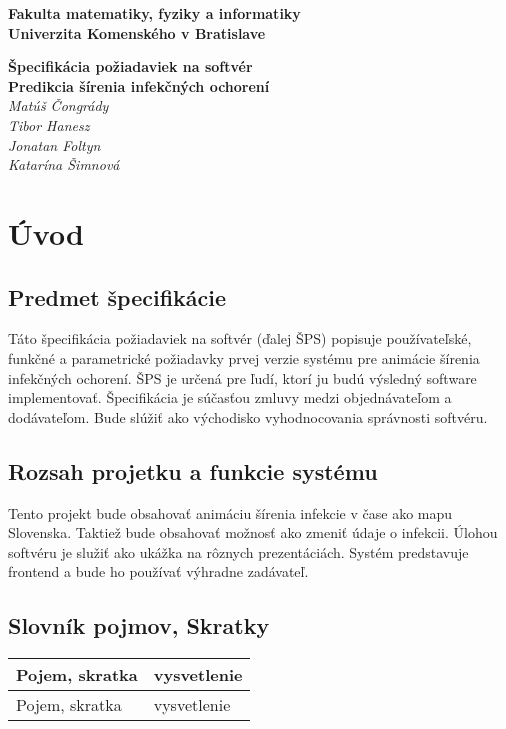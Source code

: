 \documentclass[12pt,a4paper]{report}
\begin{document}
\begin{titlepage}
\centering\bfseries
		Fakulta matematiky, fyziky a informatiky\\Univerzita Komenského v Bratislave	

	\fontsize{23}{28}\textbf{Špecifikácia požiadaviek na softvér}\\
	\fontsize{16}{22}\textbf{Predikcia šírenia infekčných ochorení}\\
	\large\textit{Matúš Čongrády\\Tibor Hanesz\\Jonatan Foltyn\\Katarína Šimnová}

\end{titlepage}\bigskip
	\setcounter{tocdepth}{9}
	\tableofcontents
	
\renewcommand{\chaptername}{}	
	\chapter[Úvod]{\rmfamily\bfseries
Úvod}


\section[Predmet špecifikácie]{\rmfamily\bfseries
	Predmet špecifikácie}
Táto špecifikácia požiadaviek na softvér (ďalej ŠPS) popisuje používateľské, funkčné a parametrické požiadavky prvej verzie systému pre animácie šírenia infekčných ochorení. ŠPS je určená pre ľudí, ktorí ju budú výsledný software implementovať. Špecifikácia je súčasťou zmluvy medzi objednávateľom a dodávateľom. Bude slúžiť ako východisko vyhodnocovania správnosti softvéru.

\section[Rozsah projetku a funkcie systému]{\rmfamily\bfseries
Rozsah projetku a funkcie systému}	
Tento projekt bude obsahovať animáciu šírenia infekcie v čase ako mapu Slovenska. Taktiež bude obsahovať možnosť ako zmeniť údaje o infekcii. Úlohou softvéru je služiť ako ukážka na rôznych prezentáciách. Systém predstavuje frontend a bude ho používať výhradne zadávateľ. 

\section[Slovník pojmov, Skratky]{\rmfamily\bfseries
	Slovník pojmov, Skratky}	
\begin{table}[h!]
	\centering
	\begin{tabular}{|>{\centering\arraybackslash}m{1in}|>{\centering\arraybackslash}m{1in}|}
		\hline
		\centering Pojem, skratka & vysvetlenie \\ [0ex]
		\hline
		Pojem, skratka & vysvetlenie \\ [0ex]
		\hline
	\end{tabular}
\end{table}
\end{document}
